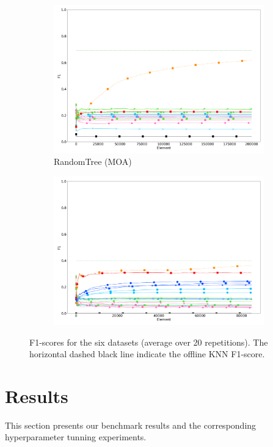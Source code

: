 \begin{figure}
\begin{subfigure}[t]{.49\linewidth}
		\includegraphics[width=\linewidth]{figures/results/dataset_3_f1.png}
		\caption{RandomTree (MOA)}
		\label{fig:f1-dataset_3}
	\end{subfigure}
	\begin{subfigure}[t]{.49\linewidth}
		\includegraphics[width=\linewidth]{figures/results/recofit_6_f1.png}
		\caption{\recofitdataset}
		\label{fig:f1-recofit}
	\end{subfigure}
	\caption{F1-scores for the six datasets (average over 20 repetitions). The horizontal dashed black line indicate the offline KNN F1-score.}
	\label{fig:f1}
\end{figure}

\section{Results}
This section presents our benchmark results and the corresponding
hyperparameter tunning experiments.

